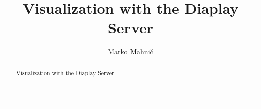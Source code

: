 \documentclass[a4paper,11pt,pdf]{templates/cogxreport}
\title{Visualization with the Diaplay Server}
\author{Marko Mahnič}
\begin{document}
\maketitle
\thispagestyle{empty}

\begin{abstract}
Visualization with the Diaplay Server
\end{abstract}

\vspace{.2em}
\hrule

\newpage

\footnotesize
\tableofcontents
\normalsize



\end{document}
